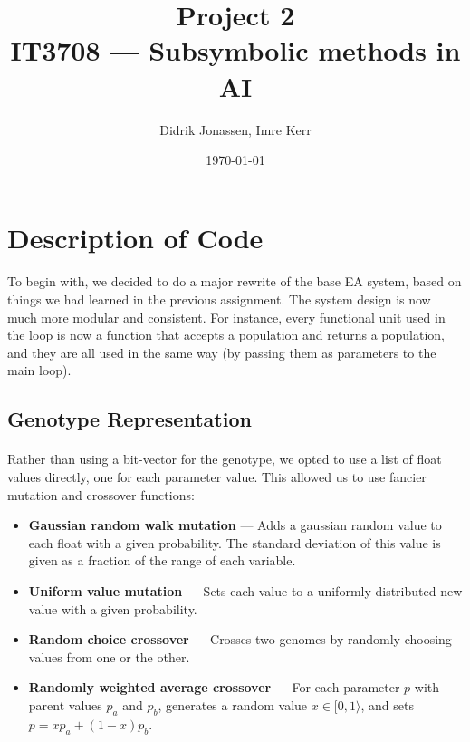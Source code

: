 \documentclass[a4paper,12pt]{article}
\author{Didrik Jonassen, Imre Kerr}
\title{Project 2\\ IT3708 --- Subsymbolic methods in AI}
\date{\today}
\begin{document}
\maketitle

\section{Description of Code}

\paragraph{}To begin with, we decided to do a major rewrite of the base EA system, based on things we had learned in the previous assignment. The system design is now much more modular and consistent. For instance, every functional unit used in the loop is now a function that accepts a population and returns a population, and they are all used in the same way (by passing them as parameters to the main loop).

\subsection{Genotype Representation}

\paragraph{}Rather than using a bit-vector for the genotype, we opted to use a list of float values directly, one for each parameter value. This allowed us to use fancier mutation and crossover functions:
\begin{itemize}
\item{\textbf{Gaussian random walk mutation} --- Adds a gaussian random value to each float with a given probability. The standard deviation of this value is given as a fraction of the range of each variable.}
\item{\textbf{Uniform value mutation} --- Sets each value to a uniformly distributed new value with a given probability.}
\item{\textbf{Random choice crossover} --- Crosses two genomes by randomly choosing values from one or the other.}
\item{\textbf{Randomly weighted average crossover} --- For each parameter $p$ with parent values $p_a$ and $p_b$, generates a random value $x \in [ 0, 1 \rangle$, and sets $p = x p_a + (1-x)p_b$.}
\end{itemize}
\end{document}
